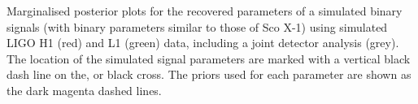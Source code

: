 \label{fig:scox1_inj}
Marginalised posterior plots for the recovered parameters of a simulated binary signals (with binary parameters
similar to those of Sco X-1) using simulated LIGO H1 (red) and L1 (green) data, including a joint detector analysis
(grey). The location of the simulated signal parameters are marked with a vertical black dash line on the, or black
cross. The priors used for each parameter are shown as the dark magenta dashed lines.
